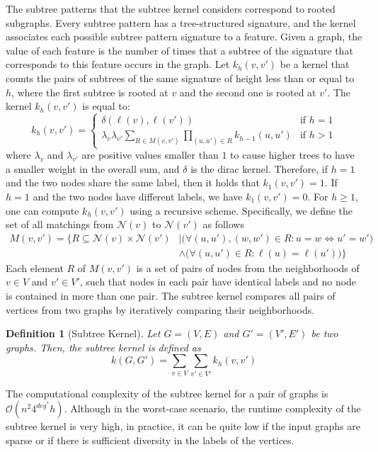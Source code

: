 \documentclass[twoside,11pt]{article}
\newtheorem{definition}{Definition}
\begin{document}
The subtree patterns that the subtree kernel considers correspond to rooted subgraphs.
Every subtree pattern has a tree-structured signature, and the kernel associates each possible subtree pattern signature to a feature.
Given a graph, the value of each feature is the number of times that a subtree of the signature that corresponds to this feature occurs in the graph.
Let $k_h(v,v')$ be a kernel that counts the pairs of subtrees of the same signature of height less than or equal to $h$, where the first subtree is rooted at $v$ and the second one is rooted at $v'$.
The kernel $k_h(v,v')$ is equal to:
\begin{equation}
  k_h(v, v') =
  \begin{cases}
    \delta(\ell(v), \ell(v')) & \text{if } h=1 \\
    \lambda_v \lambda_{v'} \sum_{R \in M(v,v')} \prod_{(u,u') \in R} k_{h-1}(u,u') & \text{if } h > 1
  \end{cases}
\end{equation}
where $\lambda_v$ and $\lambda_{v'}$ are positive values smaller than $1$ to cause higher trees to have a smaller weight in the overall sum, and $\delta$ is the dirac kernel.
Therefore, if $h=1$ and the two nodes share the same label, then it holds that $k_1(v,v')=1$.
If $h=1$ and the two nodes have different labels, we have $k_1(v,v')=0$.
For $h \geq 1$, one can compute $k_h(v,v')$ using a recursive scheme.
Specifically, we define the set of all matchings from $\mathcal{N}(v)$ to $\mathcal{N}(v')$ as follows
\begin{equation}
  \begin{split}
    M(v,v') = \Big\{ R \subseteq \mathcal{N}(v) \times \mathcal{N}(v') &| \big( \forall (u,u'),(w,w') \in R : u=w \Leftrightarrow u'=w' \big) \\
    &\wedge \big( \forall (u,u') \in R : \ell(u) = \ell(u') \big) \Big\}
  \end{split}
\end{equation}
Each element $R$ of $M(v,v')$ is a set of pairs of nodes from the neighborhoods of $v \in V$ and $v' \in V'$, such that nodes in each pair have identical labels and no node is contained in more than one pair.
The subtree kernel compares all pairs of vertices from two graphs by iteratively comparing their neighborhoods.
\begin{definition}[Subtree Kernel]
  Let $G=(V,E)$ and $G'=(V',E')$ be two graphs.
  Then, the subtree kernel is defined as
  \begin{equation}
    k(G, G') = \sum_{v \in V} \sum_{v' \in V'} k_h(v,v')
  \end{equation}
\end{definition}
The computational complexity of the subtree kernel for a pair of graphs is $\mathcal{O}(n^2 4^{deg^*} h)$.
Although in the worst-case scenario, the runtime complexity of the subtree kernel is very high, in practice, it can be quite low if the input graphs are sparse or if there is sufficient diversity in the labels of the vertices.
\end{document}
